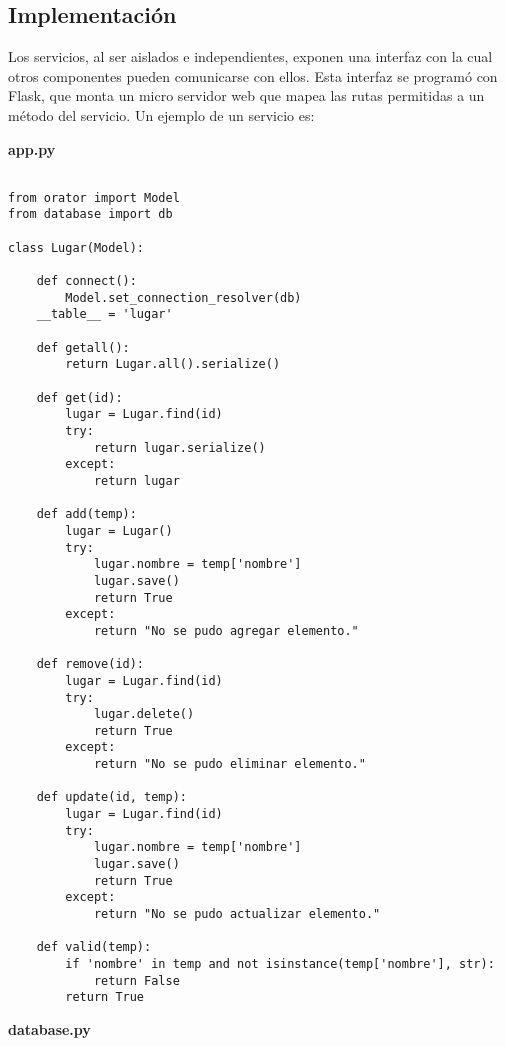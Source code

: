 \subsection{Implementación}
Los servicios, al ser aislados e independientes, exponen una interfaz con la cual otros componentes pueden comunicarse con ellos. Esta interfaz se programó con Flask, que monta un micro servidor web que mapea las rutas permitidas a un método del servicio. Un ejemplo de un servicio es:

{ \sffamily \textbf{app.py}}

\begin{mdframed}[linecolor=black, topline=true, bottomline=true,
  leftline=false, rightline=false, backgroundcolor=LightGray,userdefinedwidth=\textwidth]
  \begin{verbatim}

from orator import Model
from database import db

class Lugar(Model):

    def connect():
        Model.set_connection_resolver(db)
    __table__ = 'lugar'
    
    def getall(): 
        return Lugar.all().serialize()

    def get(id):
        lugar = Lugar.find(id)
        try:
            return lugar.serialize()
        except:
            return lugar

    def add(temp):
        lugar = Lugar()
        try:
            lugar.nombre = temp['nombre']
            lugar.save()
            return True
        except:
            return "No se pudo agregar elemento."

    def remove(id):
        lugar = Lugar.find(id)
        try:
            lugar.delete()
            return True
        except:
            return "No se pudo eliminar elemento."

    def update(id, temp):
        lugar = Lugar.find(id)
        try:
            lugar.nombre = temp['nombre']
            lugar.save()
            return True
        except:
            return "No se pudo actualizar elemento."

    def valid(temp):
        if 'nombre' in temp and not isinstance(temp['nombre'], str):
            return False
        return True
\end{verbatim}
\end{mdframed}

\pagebreak
{ \sffamily \textbf{database.py}} 

